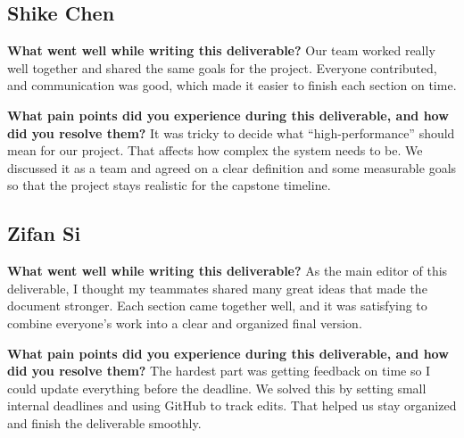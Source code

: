 \documentclass{article}
\begin{document}
\subsection*{Shike Chen}

\textbf{What went well while writing this deliverable?}  
Our team worked really well together and shared the same goals for the project.
Everyone contributed, and communication was good, which made it easier to
finish each section on time.

\textbf{What pain points did you experience during this deliverable, and how did you resolve them?}  
It was tricky to decide what “high-performance” should mean for our project.
That affects how complex the system needs to be. We discussed it as a team and
agreed on a clear definition and some measurable goals so that the project stays
realistic for the capstone timeline.


\subsection*{Zifan Si}

\textbf{What went well while writing this deliverable?}  
As the main editor of this deliverable, I thought my teammates shared many great
ideas that made the document stronger. Each section came together well, and it
was satisfying to combine everyone’s work into a clear and organized final
version.

\textbf{What pain points did you experience during this deliverable, and how did you resolve them?}  
The hardest part was getting feedback on time so I could update everything
before the deadline. We solved this by setting small internal deadlines and
using GitHub to track edits. That helped us stay organized and finish the
deliverable smoothly.



\end{document}
